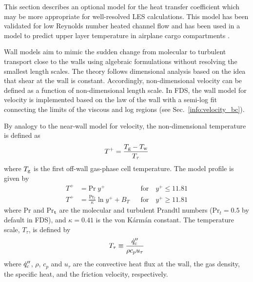 This section describes an optional model for the heat transfer coefficient which may be more appropriate for well-resolved LES calculations.  This model has been validated for low Reynolds number heated channel flow \cite{Park:2012} and has been used in a model to predict upper layer temperature in airplane cargo compartments \cite{Oztekin:FM2012}.

Wall models aim to mimic the sudden change from molecular to turbulent transport close to the walls using algebraic formulations without resolving the smallest length scales. The theory follows dimensional analysis based on the idea that shear at the wall is constant. Accordingly, non-dimensional velocity can be defined as a function of non-dimensional length scale. In FDS, the wall model for velocity is implemented based on the law of the wall with a semi-log fit connecting the limits of the viscous and log regions (see Sec.~\ref{info:velocity_bc}).

By analogy to the near-wall model for velocity, the non-dimensional temperature is defined as
\begin{equation}
T^+ = \frac{T_{\rm g} - T_{\rm w}}{T_\tau}
\end{equation}
where $T_{\rm g}$ is the first off-wall gas-phase cell temperature.  The model profile is given by
\begin{align}
\label{eqn_t_visclayer} T^+ &= \mbox{Pr}\;y^+                            && \mbox{for} \quad y^+ \le 11.81 \\
\label{eqn_t_loglaw}    T^+ &= \frac{\mbox{Pr}_t}{\kappa} \ln y^+ + B_T  && \mbox{for} \quad y^+ \ge 11.81
\end{align}
where Pr and Pr$_{\rm t}$ are the molecular and turbulent Prandtl numbers  (Pr$_t=0.5$ by default in FDS), and $\kappa = 0.41$ is the von K\'arm\'an constant.  The temperature scale, $T_{\tau}$, is defined by
\begin{equation}
\label{eqn_friction_temperature}
T_{\tau} \equiv \frac{\dot{q}_{\rm c}''}{{\rho}{c_p}{u_{\tau}}}
\end{equation}
where $\dot{q}_{\rm c}''$, $\rho$, $c_p$ and $u_{\tau}$  are the convective heat flux at the wall, the gas density, the specific heat, and the friction velocity, respectively.

